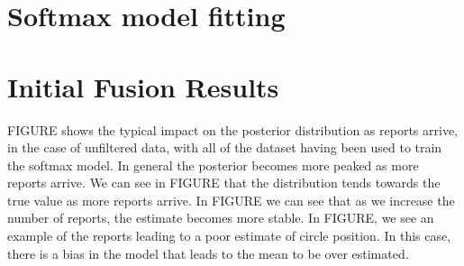 \section{Softmax model fitting}



\section{Initial Fusion Results}




FIGURE shows the typical impact on the posterior distribution as reports arrive, in the case of unfiltered data, with all of the dataset having been used to train the softmax model. 
In general the posterior becomes more peaked as more reports arrive. We can see in FIGURE that the distribution tends towards the true value as more reports arrive. 
In FIGURE we can see that as we increase the number of reports, the estimate becomes more stable. 
In FIGURE, we see an example of the reports leading to a poor estimate of circle position. 
In this case, there is a bias in the model that leads to the mean to be over estimated.  





